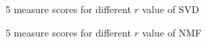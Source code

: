 \documentclass[runningheads]{llncs}
\begin{document}
\bigbreak

\begin{figure}
\centering
{}
\caption{5 measure scores for different $r$ value of SVD} \label{fig:Q5_1}
\end{figure}

\begin{figure}
\centering
{}
\caption{5 measure scores for different $r$ value of NMF} \label{fig:Q5_2}
\end{figure}
\end{document}

